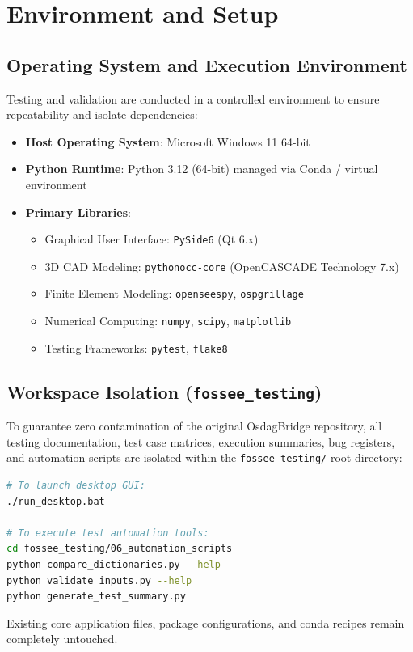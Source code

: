 \chapter{Environment and Setup}
\label{chap:environment_setup}

\section{Operating System and Execution Environment}
Testing and validation are conducted in a controlled environment to ensure repeatability and isolate dependencies:
\begin{itemize}
    \item \textbf{Host Operating System}: Microsoft Windows 11 64-bit
    \item \textbf{Python Runtime}: Python 3.12 (64-bit) managed via Conda / virtual environment
    \item \textbf{Primary Libraries}:
    \begin{itemize}
        \item Graphical User Interface: \texttt{PySide6} (Qt 6.x)
        \item 3D CAD Modeling: \texttt{pythonocc-core} (OpenCASCADE Technology 7.x)
        \item Finite Element Modeling: \texttt{openseespy}, \texttt{ospgrillage}
        \item Numerical Computing: \texttt{numpy}, \texttt{scipy}, \texttt{matplotlib}
        \item Testing Frameworks: \texttt{pytest}, \texttt{flake8}
    \end{itemize}
\end{itemize}

\section{Workspace Isolation (\texttt{fossee\_testing})}
To guarantee zero contamination of the original OsdagBridge repository, all testing documentation, test case matrices, execution summaries, bug registers, and automation scripts are isolated within the \texttt{fossee\_testing/} root directory:
\begin{lstlisting}[language=bash, caption={Execution entry points within OsdagBridge}]
# To launch desktop GUI:
./run_desktop.bat

# To execute test automation tools:
cd fossee_testing/06_automation_scripts
python compare_dictionaries.py --help
python validate_inputs.py --help
python generate_test_summary.py
\end{lstlisting}
Existing core application files, package configurations, and conda recipes remain completely untouched.
